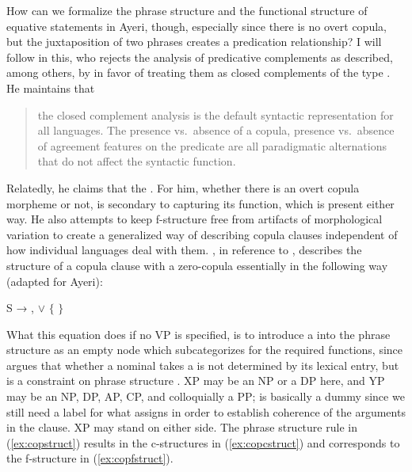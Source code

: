 How can we formalize the phrase structure and the functional structure of
equative statements in Ayeri, though, especially since there is no overt
copula, but the juxtaposition of two phrases creates a predication
relationship? I will follow \citet{attia2008} in this, who rejects the analysis
of predicative complements as \XCompl{} described, among others, by
\citet{bresnan2016} in favor of treating them as closed complements of the
\Plink{} type \citep[70]{butt1999}. He maintains that

\blockcquote[105]{attia2008}{the closed complement analysis is the default
syntactic representation for all languages. The presence vs.\ absence of a
copula, presence vs.\ absence of agreement features on the predicate are all
paradigmatic alternations that do not affect the syntactic function.}

Relatedly, he claims that the . For him, whether there is an overt copula morpheme or
not, is secondary to capturing its function, which is present either way. He
also attempts to keep f-structure free from artifacts of morphological
variation to create a generalized way of describing copula clauses
independent of how individual languages deal with them. \citet{attia2008}, in
reference to \citet{dalrymple2004}, describes the structure of a copula clause
with a zero-copula essentially in the following way (adapted for Ayeri):

\ex\label{ex:copstruct}
	S → ,  $\lor$ $\Biggl\{$\anno*[%
		\ups{\Pred}~=~%
		\astruct{null-be}{\ups{\Subj} \ups{\Plink}}%
	]{$\epsilon$} $\Biggr\}$
\xe

What this equation does if no VP is specified, is to introduce a \Pred{} into
the phrase structure as an empty node which subcategorizes for the required
functions, since \citet{attia2008} argues that whether a nominal takes a
\Plink{} is not determined by its lexical entry, but is a constraint on phrase
structure \citep[103]{attia2008}. XP may be an NP or a DP here, and YP may be
an NP, DP, AP, CP, and colloquially a PP;  is basically a dummy
since we still need a label for what assigns \Pred{} in order to establish
coherence of the arguments in the clause. XP may stand on either side. The
phrase structure rule in (\ref{ex:copstruct}) results in the c-structures in
(\ref{ex:copcstruct}) and corresponds to the f-structure in
(\ref{ex:copfstruct}).

